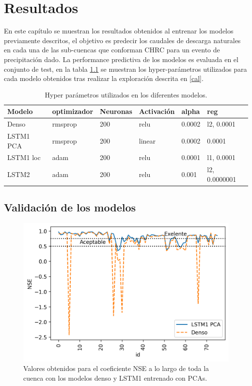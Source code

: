 \chapter{Resultados}
\label{capitulo 3}

En este capítulo se muestran los resultados obtenidos al entrenar los modelos previamente descritos, 
el objetivo es predecir los caudales de descarga naturales en cada una de las sub-cuencas que conforman CHRC para  un evento de precipitación dado. 
La performance predictiva de los modelos es evaluada en el conjunto de test, 
en la tabla \ref{hyperres} se muestran los hyper-parámetros utilizados para cada modelo obtenidos
tras realizar la exploración descrita en \ref{cal}.


\begin{table}[]
  \begin{center} 
  \begin{tabular}{|l|l|l|l|l|l|}
    \hline
   Modelo&optimizador &Neuronas & Activación & alpha & reg \\
   \hline
   Denso & rmsprop& 200& relu & 0.0002 &l2, 0.0001  \\
   LSTM1 PCA & rmsprop  &200 & linear & 0.0002  &  0.0001 \\
   LSTM1 loc & adam & 200 & relu & 0.0001 &  l1, 0.0001  \\
   LSTM2 & adam & 200 & relu &  0.001 & l2, 0.0000001 \\
  
   \hline

  \end{tabular}
  \caption{ Hyper parámetros utilizados en los diferentes modelos.}
  \label{hyperres}
\end{center}
  \end{table}

\section{Validación de los modelos}


 \begin{figure}[h!]
   \begin{center}
     \includegraphics[height=3.in]{Figures/NSE/NSEs_LSTM1s_PCA.png}
     \caption{ Valores obtenidos para el coeficiente NSE a lo largo de toda la cuenca con los modelos denso
     y LSTM1 entrenado con PCAs.}
     \label{NSE1}
   \end{center}
 \end{figure}


